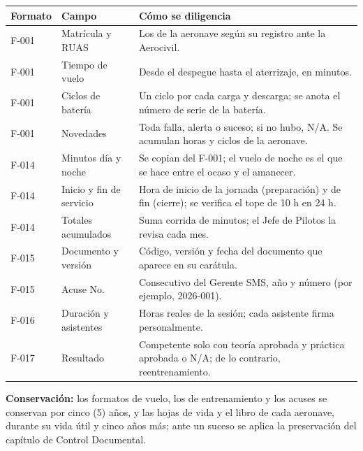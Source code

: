 \begin{longtable}{|p{2cm}|p{4.3cm}|p{8cm}|}
\hline
\rowcolor[gray]{0.9}\textbf{Formato} & \textbf{Campo} & \textbf{Cómo se diligencia} \\ \hline
\endhead
F-001 & Matrícula y RUAS & Los de la aeronave según su registro ante la Aerocivil. \\ \hline
F-001 & Tiempo de vuelo & Desde el despegue hasta el aterrizaje, en minutos. \\ \hline
F-001 & Ciclos de batería & Un ciclo por cada carga y descarga; se anota el número de serie de la batería. \\ \hline
F-001 & Novedades & Toda falla, alerta o suceso; si no hubo, N/A. Se acumulan horas y ciclos de la aeronave. \\ \hline
F-014 & Minutos día y noche & Se copian del F-001; el vuelo de noche es el que se hace entre el ocaso y el amanecer. \\ \hline
F-014 & Inicio y fin de servicio & Hora de inicio de la jornada (preparación) y de fin (cierre); se verifica el tope de 10 h en 24 h. \\ \hline
F-014 & Totales acumulados & Suma corrida de minutos; el Jefe de Pilotos la revisa cada mes. \\ \hline
F-015 & Documento y versión & Código, versión y fecha del documento que aparece en su carátula. \\ \hline
F-015 & Acuse No. & Consecutivo del Gerente SMS, año y número (por ejemplo, 2026-001). \\ \hline
F-016 & Duración y asistentes & Horas reales de la sesión; cada asistente firma personalmente. \\ \hline
F-017 & Resultado & Competente solo con teoría aprobada y práctica aprobada o N/A; de lo contrario, reentrenamiento. \\ \hline
\end{longtable}

\textbf{Conservación:} los formatos de vuelo, los de entrenamiento y los acuses se conservan por cinco (5) años, y las hojas de vida y el libro de cada aeronave, durante su vida útil y cinco años más; ante un suceso se aplica la preservación del capítulo de Control Documental.
